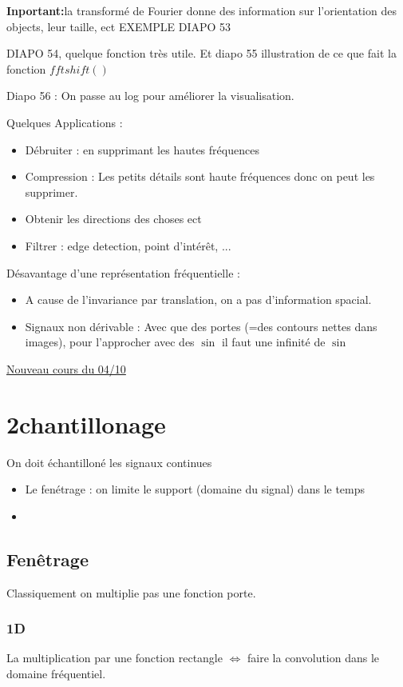 \documentclass{article}
\theoremstyle{plain}%
\theoremstyle{definition}
\theoremstyle{remark}
\begin{document}
\textbf{Inportant:}la transformé de Fourier donne des information sur l'orientation des objects, leur taille, ect EXEMPLE DIAPO 53

DIAPO 54, quelque fonction très utile. Et diapo 55 illustration de ce que fait la fonction $ fftshift() $

Diapo 56 : On passe au log pour améliorer la visualisation. 

Quelques Applications : \begin{itemize}
    \item Débruiter : en supprimant les hautes fréquences
    \item Compression : Les petits détails sont haute fréquences donc on peut les supprimer.
    \item Obtenir les directions des choses ect
    \item Filtrer : edge detection, point d'intérêt, ... 
\end{itemize}

Désavantage d'une représentation fréquentielle : \begin{itemize}
    \item A cause de l'invariance par translation, on a pas d'information spacial.
    \item Signaux non dérivable : Avec que des portes (=des contours nettes dans images), pour l'approcher avec des $ \sin  $ il faut une infinité de $ \sin  $ 
\end{itemize}

\underline{Nouveau cours du 04/10} \\
\section{2chantillonage}
On doit échantilloné les signaux continues \begin{itemize}
    \item Le fenétrage : on limite le support (domaine du signal) dans le temps
    \item 
\end{itemize}

\subsection{Fenêtrage}
Classiquement on multiplie pas une fonction porte.

\subsubsection{1D}
La multiplication par une fonction rectangle $ \Leftrightarrow $ faire la convolution dans le domaine fréquentiel.
\end{document}

